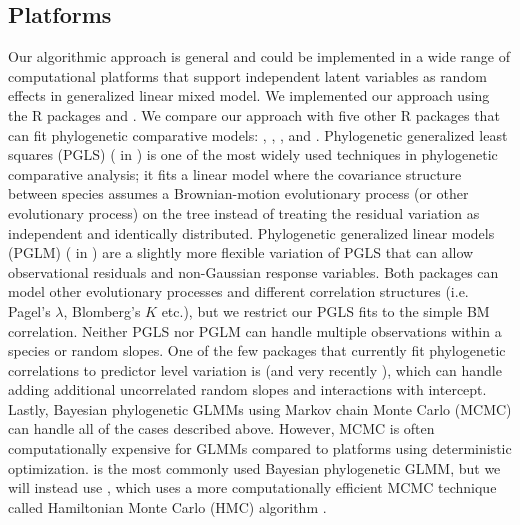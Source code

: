 \documentclass[12pt]{article}
\begin{document}
\subsection*{Platforms}

Our algorithmic approach is general and could be implemented in a wide range of computational platforms that support independent latent variables as random effects in generalized linear mixed model. 
We implemented our approach using the R packages  \citep{bates2015fitting} and  \citep{brooks2017glmmTMB}.
We compare our approach with five other R packages that can fit phylogenetic comparative models:  \citep{pinheiro2014r},  \citep{ho2014phylolm},  \citep{pearse2015pez}, and  \citep{burkner2016brms}.
Phylogenetic generalized least squares (PGLS) ( in ) is one of the most widely used techniques in phylogenetic comparative analysis; it fits a linear model where the covariance structure between species assumes a Brownian-motion evolutionary process (or other evolutionary process) on the tree instead of treating the residual variation as independent and identically distributed. 
Phylogenetic generalized linear models (PGLM) ( in ) are a slightly more flexible variation of PGLS that can allow observational residuals and non-Gaussian response variables.
Both packages can model other evolutionary processes and different correlation structures (i.e. Pagel's $\lambda$, Blomberg's $K$ etc.), but we restrict our PGLS fits to the simple BM correlation. 
Neither PGLS nor PGLM can handle multiple observations within a species or random slopes.
One of the few packages that currently fit phylogenetic correlations to predictor level variation is  (and very recently ), which can handle adding additional uncorrelated random slopes and interactions with intercept.
Lastly, Bayesian phylogenetic GLMMs using Markov chain Monte Carlo (MCMC) can handle all of the cases described above. 
However, MCMC is often computationally expensive for GLMMs compared to platforms using deterministic optimization.
 \citep{hadfield2010general} is the most commonly used Bayesian phylogenetic GLMM, but we will instead use , which uses a more computationally efficient MCMC technique called Hamiltonian Monte Carlo (HMC) algorithm \citep{duane1987hybrid}.
 
\end{document}
